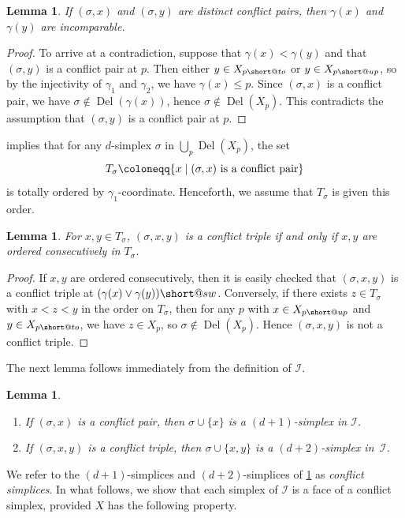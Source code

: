 \documentclass[11pt]{amsart}
\makeatletter
\DeclareMathOperator{\DelT}{Del}
\newcommand{\Incr}[0]{\mathcal{I}}
\DeclareRobustCommand{\subto}{%
  \mathrel{\mathpalette\short@to\relax}%
}
\newcommand{\short@to}[2]{%
  \mkern2mu
  \clipbox{{.35\width} 0 0 0}{$\m@th#1\vphantom{+}{\rightarrow}$}%
  }
\DeclareRobustCommand{\subup}{%
  \mathrel{\mathpalette\short@up\relax}%
}
\newcommand{\short@up}[2]{%
  \mkern2mu
  \clipbox{0 {.35\height} 0 0}{$\m@th#1\vphantom{+}{\uparrow}$}%
}
\DeclareRobustCommand{\subdownleft}{%
  \mathrel{\mathpalette\short@sw\relax}%
}
\newcommand{\short@sw}[2]{%
  \mkern2mu
  \clipbox{0 0 {.55\width} {.55\height}}{$\m@th#1\vphantom{+}{\swarrow}$}%
}
\theoremstyle{plain}
\newtheorem{lemma}[theorem]{Lemma}
\theoremstyle{definition}
\theoremstyle{remark}
\makeatother
\begin{document}
%
\begin{lemma}\label{lem:incomparable_conflicts}
    If $(\sigma,x)$ and $(\sigma,y)$ are distinct conflict pairs, then $\gamma(x)$ and $\gamma(y)$ are incomparable.
\end{lemma}
%
\begin{proof}
To arrive at a contradiction, suppose that $\gamma(x)<\gamma(y)$ and that $(\sigma,y)$ is a conflict pair at $p$.  Then either $y\in X_{p{\subto}}$ or $y\in X_{p{\subup}}$, so by the injectivity of $\gamma_1$ and $\gamma_2$, we have $\gamma(x)\leq p.$  Since $(\sigma,x)$ is a conflict pair, we have $\sigma\not\in \DelT(\gamma(x))$, hence $\sigma\not\in\DelT(X_p)$.  This contradicts the assumption that $(\sigma,y)$ is a conflict pair at $p$. 
\end{proof}
%
%
 implies that for any $d$-simplex $\sigma$ in $\bigcup_p \DelT(X_p)$, the set  \[T_{\sigma}\coloneqq\{x \mid (\sigma,x)\textup{ is a conflict pair}\}\] is totally ordered by $\gamma_1$-coordinate.  Henceforth, we assume that $T_{\sigma}$ is given this order.
%
\begin{lemma}\label{lem:consec_order_conflict_triple}
For $x,y\in T_{\sigma}$, $(\sigma,x,y)$ is a conflict triple if and only if $x,y$ are ordered consecutively in $T_{\sigma}$.
\end{lemma}
%
\begin{proof}
If $x,y$ are ordered consecutively, then it is easily checked that $(\sigma,x,y)$ is a conflict triple at $(\gamma(x) \vee \gamma(y)){\subdownleft}$.  Conversely, if there exists $z\in T_{\sigma}$ with $x<z<y$ in the order on $T_{\sigma}$, then for any $p$ with $x\in X_{p\subup}$ and  $y\in X_{p\subto}$, we have $z\in X_{p}$, so $\sigma\not \in \DelT(X_p)$.  Hence $(\sigma,x,y)$ is  not a conflict triple.   
\end{proof}
%
%
The next lemma follows immediately from the definition of $\Incr$.
%
\begin{lemma}\label{lem:conflicts}\mbox{}
\begin{enumerate}
\item[(i)] If $(\sigma, x)$ is a conflict pair, then  $\sigma \cup \{x\}$  is a $(d+1)$-simplex in $\Incr$. 
\item[(ii)] If $(\sigma, x, y)$ is a conflict triple, then $\sigma \cup \{x, y\}$ is a $(d+2)$-simplex in~$\Incr$.
\end{enumerate}
\end{lemma}
%
We refer to the $(d+1)$-simplices and  $(d+2)$-simplices of \cref{lem:conflicts} as \emph{conflict simplices}.  In what follows, we show that each simplex of $\Incr$ is a face of a conflict simplex, provided $X$ has the following property.  
\end{document}
